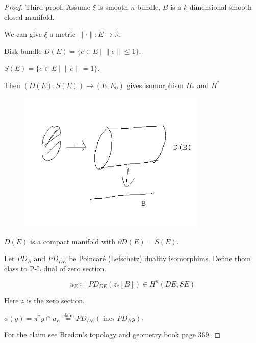 \documentclass{article}
\theoremstyle{definition}
\begin{document}
    \begin{proof}
        Third proof. Assume \(\xi\) is smooth \(n\)-bundle, \(B\) is a \(k\)-dimensional smooth closed manifold. 

        We can give \(\xi\) a metric \(\lVert \cdot \rVert : E \to \mathbb{R}\).

        Disk bundle \(D(E) = \{ e\in E \mid \lVert e \rVert \leq 1 \}\).

        \(S(E) = \{ e\in E \mid \lVert e \rVert = 1 \}\).

        Then \((D(E), S(E)) \to (E,E_0)\) gives isomorphism \(H_{\ast}\) and \(H^{\ast}\)
        
        \begin{figure}[H]
            \centering
            \includegraphics[width=0.8\textwidth]{img/DESE_example}
        \end{figure}

        \(D(E)\) is a compact manifold with \(\partial D(E) = S(E)\).

        Let \(PD_B \text{ and } PD_{DE}\) be Poincar\'e (Lefschetz) duality isomorphims. Define thom class to P-L dual of zero section.
        
        \[
            u_E \coloneqq PD_{DE} (z_{\ast} [B]) \in H^n (DE, SE)
        \]

        Here \(z\) is the zero section.

        \(\phi(y) = \pi^{\ast} y \cap u_E \overset{\text{claim}}{=} PD_{DE} (\operatorname{inc}_{\ast} PD_B y)\).

        For the claim see Bredon's topology and geometry book page 369.

    \end{proof}
\end{document}
